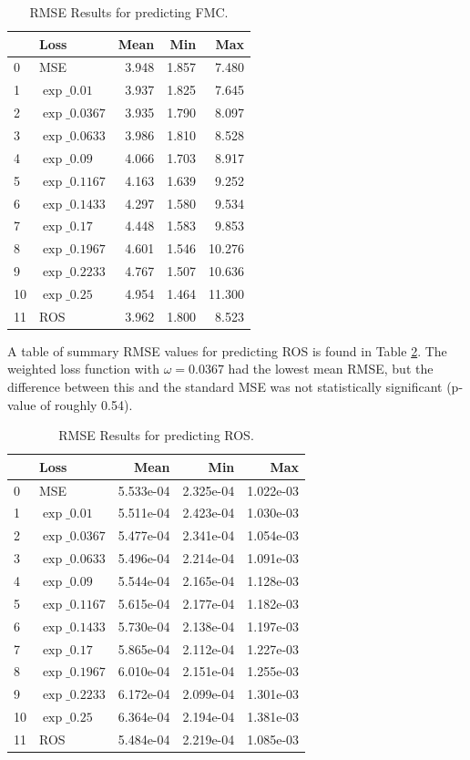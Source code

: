 \documentclass[11pt]{article}%
\begin{document}
\begin{table}[ht]
\centering
\caption{RMSE Results for predicting FMC.}
\label{tab:fmc_results}
\begin{tabular}{llrrr}
\toprule
 & Loss & Mean & Min & Max \\
\midrule
0 & MSE & 3.948 & 1.857 & 7.480 \\
1 & $\exp\_0.01$ & 3.937 & 1.825 & 7.645 \\
2 & $\exp\_0.0367$ & 3.935 & 1.790 & 8.097 \\
3 & $\exp\_0.0633$ & 3.986 & 1.810 & 8.528 \\
4 & $\exp\_0.09$ & 4.066 & 1.703 & 8.917 \\
5 & $\exp\_0.1167$ & 4.163 & 1.639 & 9.252 \\
6 & $\exp\_0.1433$ & 4.297 & 1.580 & 9.534 \\
7 & $\exp\_0.17$ & 4.448 & 1.583 & 9.853 \\
8 & $\exp\_0.1967$ & 4.601 & 1.546 & 10.276 \\
9 & $\exp\_0.2233$ & 4.767 & 1.507 & 10.636 \\
10 & $\exp\_0.25$ & 4.954 & 1.464 & 11.300 \\
11 & ROS & 3.962 & 1.800 & 8.523 \\
\bottomrule
\end{tabular}
\end{table}

A table of summary RMSE values for predicting ROS is found in Table \ref{tab:ros_results}. The weighted loss function with $\omega=0.0367$ had the lowest mean RMSE, but the difference between this and the standard MSE was not statistically significant (p-value of roughly 0.54).

\begin{table}[ht]
\centering
\caption{RMSE Results for predicting ROS.}
\label{tab:ros_results}
\begin{tabular}{llrrr}
\toprule
\toprule
 & Loss & Mean & Min & Max \\
\midrule
0 & MSE & 5.533e-04 & 2.325e-04 & 1.022e-03 \\
1 & $\exp\_0.01$ & 5.511e-04 & 2.423e-04 & 1.030e-03 \\
2 & $\exp\_0.0367$ & 5.477e-04 & 2.341e-04 & 1.054e-03 \\
3 & $\exp\_0.0633$ & 5.496e-04 & 2.214e-04 & 1.091e-03 \\
4 & $\exp\_0.09$ & 5.544e-04 & 2.165e-04 & 1.128e-03 \\
5 & $\exp\_0.1167$ & 5.615e-04 & 2.177e-04 & 1.182e-03 \\
6 & $\exp\_0.1433$ & 5.730e-04 & 2.138e-04 & 1.197e-03 \\
7 & $\exp\_0.17$ & 5.865e-04 & 2.112e-04 & 1.227e-03 \\
8 & $\exp\_0.1967$ & 6.010e-04 & 2.151e-04 & 1.255e-03 \\
9 & $\exp\_0.2233$ & 6.172e-04 & 2.099e-04 & 1.301e-03 \\
10 & $\exp\_0.25$ & 6.364e-04 & 2.194e-04 & 1.381e-03 \\
11 & ROS & 5.484e-04 & 2.219e-04 & 1.085e-03 \\
\bottomrule
\bottomrule
\end{tabular}
\end{table}
\end{document}
